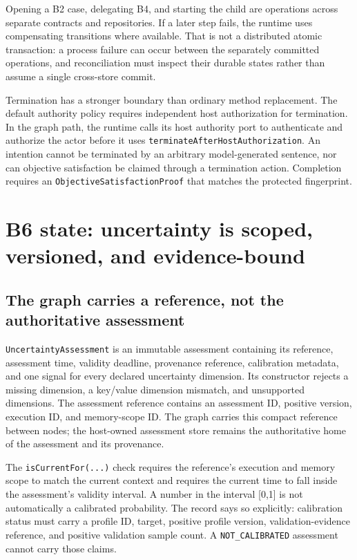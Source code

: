 Opening a B2 case, delegating B4, and starting the child are operations across separate contracts and repositories. If a later step fails, the runtime uses compensating transitions where available. That is not a distributed atomic transaction: a process failure can occur between the separately committed operations, and reconciliation must inspect their durable states rather than assume a single cross-store commit.

Termination has a stronger boundary than ordinary method replacement. The default authority policy requires independent host authorization for termination. In the graph path, the runtime calls its host authority port to authenticate and authorize the actor before it uses \texttt{terminateAfterHostAuthorization}. An intention cannot be terminated by an arbitrary model-generated sentence, nor can objective satisfaction be claimed through a termination action. Completion requires an \texttt{ObjectiveSatisfactionProof} that matches the protected fingerprint.

\section{B6 state: uncertainty is scoped, versioned, and evidence-bound}
\label{sec:ch23-b6-uncertainty}

\subsection{The graph carries a reference, not the authoritative assessment}
\label{subsec:ch23-uncertainty-reference}

\texttt{UncertaintyAssessment} is an immutable assessment containing its reference, assessment time, validity deadline, provenance reference, calibration metadata, and one signal for every declared uncertainty dimension. Its constructor rejects a missing dimension, a key/value dimension mismatch, and unsupported dimensions. The assessment reference contains an assessment ID, positive version, execution ID, and memory-scope ID. The graph carries this compact reference between nodes; the host-owned assessment store remains the authoritative home of the assessment and its provenance.

The \texttt{isCurrentFor(...)} check requires the reference's execution and memory scope to match the current context and requires the current time to fall inside the assessment's validity interval. A number in the interval [0,1] is not automatically a calibrated probability. The record says so explicitly: calibration status must carry a profile ID, target, positive profile version, validation-evidence reference, and positive validation sample count. A \texttt{NOT\_CALIBRATED} assessment cannot carry those claims.

